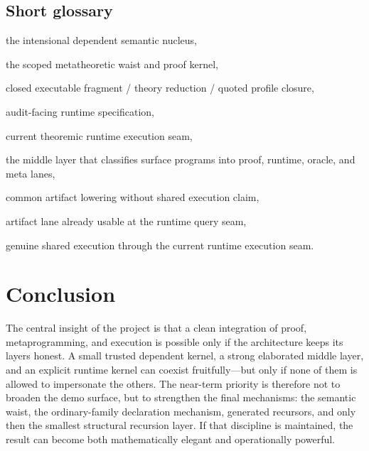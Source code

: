 \documentclass[11pt]{article}
\newcommand{\metta}{\textsc{MeTTa}}
\newcommand{\pure}{\textsc{MeTTa-Pure}}
\newcommand{\purekernel}{\textsc{PureKernel}}
\newcommand{\runtimeexec}{R_{\mathrm{exec0}}}
\newcommand{\rspec}{R_{\mathrm{spec}}}
\begin{document}
\subsection*{Short glossary}
\begin{description}[leftmargin=2.5cm,style=nextline]
  \item[\pure{}] the intensional dependent semantic nucleus,
  \item[\purekernel{}] the scoped metatheoretic waist and proof kernel,
  \item[A/B/C1] closed executable fragment / theory reduction / quoted profile closure,
  \item[\rspec{}] audit-facing runtime specification,
  \item[\runtimeexec{}] current theoremic runtime execution seam,
  \item[Elaborated \metta-Core] the middle layer that classifies surface programs into proof, runtime, oracle, and meta lanes,
  \item[artifact-only overlap] common artifact lowering without shared execution claim,
  \item[query-compatible overlap] artifact lane already usable at the runtime query seam,
  \item[direct-exec overlap] genuine shared execution through the current runtime execution seam.
\end{description}

\section{Conclusion}
The central insight of the project is that a clean integration of proof, metaprogramming, and execution is possible only if the architecture keeps its layers honest. A small trusted dependent kernel, a strong elaborated middle layer, and an explicit runtime kernel can coexist fruitfully---but only if none of them is allowed to impersonate the others. The near-term priority is therefore not to broaden the demo surface, but to strengthen the final mechanisms: the semantic waist, the ordinary-family declaration mechanism, generated recursors, and only then the smallest structural recursion layer. If that discipline is maintained, the result can become both mathematically elegant and operationally powerful.
\end{document}
